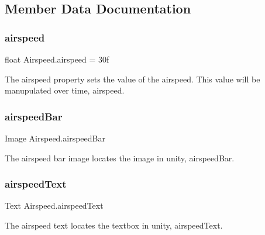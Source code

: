 \subsection{Member Data Documentation}
\mbox{\label{class_airspeed_abf040dee278544fcfa5736e89d7d8686}} 
\subsubsection{\texorpdfstring{airspeed}{airspeed}}
{\footnotesize\ttfamily float Airspeed.\+airspeed = 30f}



The airspeed property sets the value of the airspeed. This value will be manupulated over time, airspeed. 

\mbox{\label{class_airspeed_a7fc2cbbc48005b31a2f43b4ffac4de20}} 
\subsubsection{\texorpdfstring{airspeed\+Bar}{airspeedBar}}
{\footnotesize\ttfamily Image Airspeed.\+airspeed\+Bar\hspace{0.3cm}{\ttfamily [static]}}



The airspeed bar image locates the image in unity, airspeed\+Bar. 

\mbox{\label{class_airspeed_a249c74d2a58b5947d27f35fa29ee20f1}} 
\subsubsection{\texorpdfstring{airspeed\+Text}{airspeedText}}
{\footnotesize\ttfamily Text Airspeed.\+airspeed\+Text\hspace{0.3cm}{\ttfamily [static]}}



The airspeed text locates the textbox in unity, airspeed\+Text. 

\mbox{\label{class_airspeed_a670ab8ceb6bf47a56d83ace7ab46d119}} 

